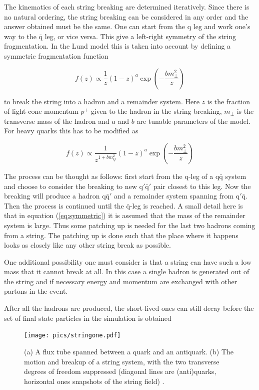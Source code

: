 The kinematics of each string breaking are determined iteratively. Since there is no natural ordering, the string breaking can be considered in any order and the answer obtained must be the same. One can start from the q leg and work one's way to the $\bar{\mathrm{q}}$ leg, or vice versa. This give a left-right symmetry of the string fragmentation. In the Lund model this is taken into account by defining a symmetric fragmentation function

\begin{equation}
f\left(z\right) \propto \frac{1}{z} \left(1-z\right)^a \exp \left(-\frac{b m_\perp ^2}{z} \right)
\label{eq:symmetric}
\end{equation}

\noindent to break the string into a hadron and a remainder system. Here $z$ is the fraction of light-cone momentum $p^+$ given to the hadron in the string breaking, $m_\perp$ is the transverse mass of the hadron and $a$ and $b$ are tunable parameters of the model. For heavy quarks this has to be modified as 

\begin{equation}
f\left(z\right) \propto \frac{1}{z^{1+bm_Q^2}} \left(1-z\right)^a \exp \left(-\frac{b m_\perp ^2}{z} \right)
\label{eq:symmetric2}
\end{equation}

The process can be thought as follows: first start from the q-leg of a $\mathrm{q \bar{q}}$ system and choose to consider the breaking to new $\mathrm{q' \bar q'}$ pair closest to this leg. Now the breaking will produce a hadron $\mathrm{q \bar{q}'}$ and a remainder system spanning from $\mathrm{q' \bar{q}}$. Then the process is continued until the $\bar{\mathrm{q}}$-leg is reached. A small detail here is that in equation (\ref{eq:symmetric}) it is assumed that the mass of the remainder system is large. Thus some patching up is needed for the last two hadrons coming from a string. The patching up is done such that the place where it happens looks as closely like any other string break as possible.


One additional possibility one must consider is that a string can have such a low mass that it cannot break at all. In this case a single hadron is generated out of the string and if necessary  energy and momentum are exchanged with other partons in the event.

After all the hadrons are produced, the short-lived ones can still decay before the set of final state particles in the simulation is obtained~\cite{missing}
\begin{figure}
\centering
\texttt{[image: pics/stringone.pdf]}
\caption[]{ (a) A flux tube spanned between a quark and an antiquark. (b) The motion
and breakup of a string system, with the two transverse degrees of freedom suppressed
(diagonal lines are (anti)quarks, horizontal ones snapshots of the string field) \cite{eventGenerators}.
 }
\label{fig:fluxtube}
\end{figure}

